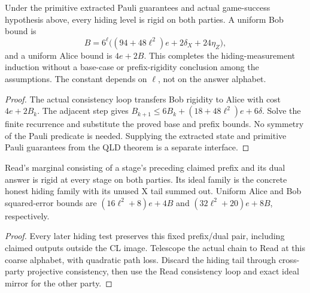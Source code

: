 \begin{lemma}
\label{lem:hide-rigidity}
\leanok
Under the primitive extracted Pauli guarantees and actual game-success
hypothesis above, every hiding level is rigid on both parties. A uniform
Bob bound is
\[
 B=6^\ell\bigl((94+48\ell^2)e+2\delta_X+24\eta_Z\bigr),
\]
and a uniform Alice bound is $4e+2B$. This completes the hiding-measurement
induction without a base-case or prefix-rigidity conclusion among the
assumptions. The constant depends on $\ell$, not on the answer alphabet.
\end{lemma}
\begin{proof}
\leanok
The actual consistency loop transfers Bob rigidity to Alice with cost
$4e+2B_k$. The adjacent step gives
$B_{k+1}\leq6B_k+(18+48\ell^2)e+6\delta$.
Solve the finite recurrence and substitute the proved base and prefix bounds.
No symmetry of the Pauli predicate is needed. Supplying the extracted state
and primitive Pauli guarantees from the QLD theorem is a separate interface.
\end{proof}

\begin{lemma}
\label{lem:intro-read-rigidity}
\leanok
Read's marginal consisting of a stage's preceding claimed prefix and its
dual answer is rigid at every stage on both parties. Its ideal family is
the concrete honest hiding family with its unused X tail summed out.
Uniform Alice and Bob squared-error bounds are $(16\ell^2+8)e+4B$ and
$(32\ell^2+20)e+8B$, respectively.
\end{lemma}
\begin{proof}
\leanok
Every later hiding test preserves this fixed prefix/dual pair, including
claimed outputs outside the CL image. Telescope the actual chain to Read
at this coarse alphabet, with quadratic path loss. Discard the hiding tail
through cross-party projective consistency, then use the Read consistency
loop and exact ideal mirror for the other party.
\end{proof}

